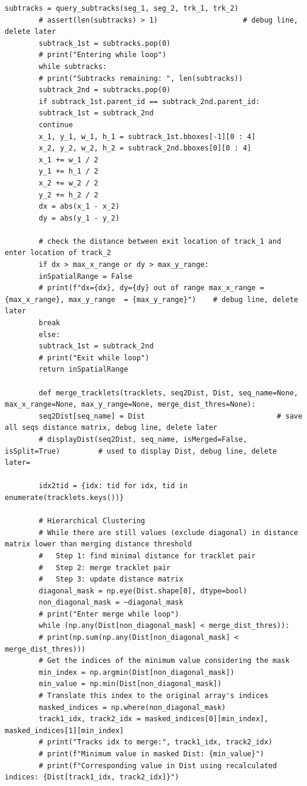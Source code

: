 \documentclass[12pt, a4paper, twoside]{article}
\begin{document}
\begin{lstlisting}[style=pythonstyle]
		subtracks = query_subtracks(seg_1, seg_2, trk_1, trk_2)
		# assert(len(subtracks) > 1)                    # debug line, delete later
		subtrack_1st = subtracks.pop(0)
		# print("Entering while loop")
		while subtracks:
		# print("Subtracks remaining: ", len(subtracks))
		subtrack_2nd = subtracks.pop(0)
		if subtrack_1st.parent_id == subtrack_2nd.parent_id:
		subtrack_1st = subtrack_2nd
		continue
		x_1, y_1, w_1, h_1 = subtrack_1st.bboxes[-1][0 : 4]
		x_2, y_2, w_2, h_2 = subtrack_2nd.bboxes[0][0 : 4]
		x_1 += w_1 / 2
		y_1 += h_1 / 2
		x_2 += w_2 / 2
		y_2 += h_2 / 2
		dx = abs(x_1 - x_2)
		dy = abs(y_1 - y_2)
		
		# check the distance between exit location of track_1 and enter location of track_2
		if dx > max_x_range or dy > max_y_range:
		inSpatialRange = False
		# print(f"dx={dx}, dy={dy} out of range max_x_range = {max_x_range}, max_y_range  = {max_y_range}")    # debug line, delete later
		break
		else:
		subtrack_1st = subtrack_2nd
		# print("Exit while loop")
		return inSpatialRange
		
		def merge_tracklets(tracklets, seq2Dist, Dist, seq_name=None, max_x_range=None, max_y_range=None, merge_dist_thres=None):
		seq2Dist[seq_name] = Dist                               # save all seqs distance matrix, debug line, delete later
		# displayDist(seq2Dist, seq_name, isMerged=False, isSplit=True)         # used to display Dist, debug line, delete later=
		
		idx2tid = {idx: tid for idx, tid in enumerate(tracklets.keys())}
		
		# Hierarchical Clustering
		# While there are still values (exclude diagonal) in distance matrix lower than merging distance threshold
		#   Step 1: find minimal distance for tracklet pair
		#   Step 2: merge tracklet pair
		#   Step 3: update distance matrix
		diagonal_mask = np.eye(Dist.shape[0], dtype=bool)
		non_diagonal_mask = ~diagonal_mask
		# print("Enter merge while loop")
		while (np.any(Dist[non_diagonal_mask] < merge_dist_thres)):
		# print(np.sum(np.any(Dist[non_diagonal_mask] < merge_dist_thres)))
		# Get the indices of the minimum value considering the mask
		min_index = np.argmin(Dist[non_diagonal_mask])
		min_value = np.min(Dist[non_diagonal_mask])
		# Translate this index to the original array's indices
		masked_indices = np.where(non_diagonal_mask)
		track1_idx, track2_idx = masked_indices[0][min_index], masked_indices[1][min_index]
		# print("Tracks idx to merge:", track1_idx, track2_idx)
		# print(f"Minimum value in masked Dist: {min_value}")
		# print(f"Corresponding value in Dist using recalculated indices: {Dist[track1_idx, track2_idx]}")
		

\end{lstlisting}
\end{document}
